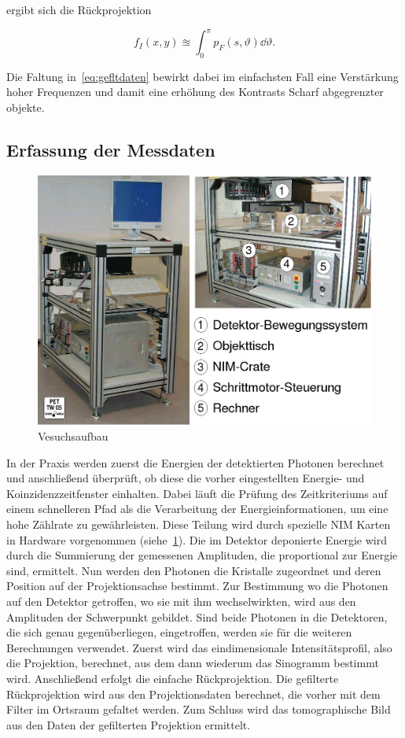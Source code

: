 \documentclass[slug=PET, room=Andreas-Schubert-Bau\,\ 424A,
supervisor=Carsten\ Bittrich, coursedate=10.\ 01.\ 2020, ngerman]{../../Lab_Report_LaTeX/lab_report}
\begin{document}
ergibt sich die Rückprojektion

\begin{equation}\label{eq:rücktrafo}
        f_I(x,y) \approxeq \int_{0}^{\pi} p_F(s,\vartheta) \dd{\vartheta}.
\end{equation}

Die Faltung in~\eqref{eq:gefltdaten} bewirkt dabei im einfachsten Fall
eine Verst\"arkung hoher Frequenzen und damit eine erh\"ohung des
Kontrasts Scharf abgegrenzter objekte.

\subsection{Erfassung der Messdaten}
\label{sec:datenerf}

\begin{figure}
 \includegraphics[width=.5\textwidth]{aufbau.png}
 \caption{Vesuchsaufbau}
 \label{fig:aufbau}
\end{figure}
In der Praxis werden zuerst die Energien der detektierten Photonen
berechnet und anschließend überprüft, ob diese die vorher
eingestellten Energie- und Koinzidenzzeitfenster einhalten. Dabei
l\"auft die Pr\"ufung des Zeitkriteriums auf einem schnelleren Pfad
als die Verarbeitung der Energieinformationen, um eine hohe Z\"ahlrate
zu gew\"ahrleisten. Diese Teilung wird durch spezielle NIM Karten in
Hardware vorgenommen (siehe~\ref{fig:aufbau}).  Die im Detektor
deponierte Energie wird durch die Summierung der gemessenen
Amplituden, die proportional zur Energie sind, ermittelt.  Nun werden
den Photonen die Kristalle zugeordnet und deren Position auf der
Projektionsachse bestimmt.  Zur Bestimmung wo die Photonen auf den
Detektor getroffen, wo sie mit ihm wechselwirkten, wird aus den
Amplituden der Schwerpunkt gebildet.  Sind beide Photonen in die
Detektoren, die sich genau gegenüberliegen, eingetroffen, werden sie
für die weiteren Berechnungen verwendet.  Zuerst wird das
eindimensionale Intensitätsprofil, also die Projektion, berechnet, aus
dem dann wiederum das Sinogramm bestimmt wird. Anschließend erfolgt
die einfache Rückprojektion.  Die gefilterte Rückprojektion wird aus
den Projektionsdaten berechnet, die vorher mit dem Filter im Ortsraum
gefaltet werden. Zum Schluss wird das tomographische Bild aus den
Daten der gefilterten Projektion ermittelt.
\end{document}
